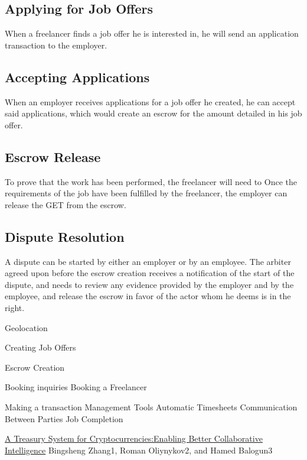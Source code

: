\documentclass{article}
\begin{document}
\subsection{Applying for Job Offers}
When a freelancer finds a job offer he is interested in, he will send an application transaction to the employer.

\subsection{Accepting Applications}
When an employer receives applications for a job offer he created, he can accept said applications, which would create an escrow for the amount detailed in his job offer.

\subsection{Escrow Release}
To prove that the work has been performed, the freelancer will need to Once the requirements of the job have been fulfilled by the freelancer, the employer can release the GET from the escrow.

\subsection{Dispute Resolution}
A dispute can be started by either an employer or by an employee. The arbiter agreed upon before the escrow creation receives a notification of the start of the dispute, and needs to review any evidence provided by the employer and by the employee, and release the escrow in favor of the actor whom he deems is in the right.

Geolocation



Creating Job Offers



Escrow Creation

Booking inquiries
Booking a Freelancer

Making a transaction
Management Tools
Automatic Timesheets
Communication Between Parties
Job Completion


\begin{thebibliography}{99}

\href{https://www.lancaster.ac.uk/staff/zhangb2/treasury.pdf}{A Treasury System for Cryptocurrencies:Enabling Better Collaborative Intelligence}
Bingsheng Zhang1, Roman Oliynykov2, and Hamed Balogun3

\end{thebibliography}
\end{document}
